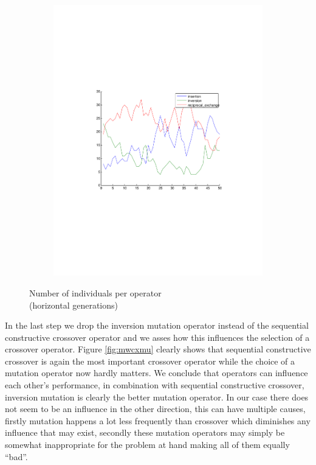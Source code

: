 \documentclass[a4paper]{article}
\begin{document}
\begin{figure}[h]
\begin{subfigure}[h]{0.49\textwidth}
    \includegraphics[width=\textwidth,trim={4cm 8cm 4cm 8cm},clip]{cwmu}
    \end{subfigure}
    \captionsetup{justification=centering}
    \caption{Number of individuals per operator\\
    		(horizontal generations)}
    \label{fig:cwcxmu}
\end{figure}

In the last step we drop the inversion mutation operator instead of
the sequential constructive crossover operator and we asses how this
influences the selection of a crossover operator.
Figure \ref{fig:mwcxmu} clearly shows that sequential constructive
crossover is again the most important crossover operator while the
choice of a mutation operator now hardly matters.
We conclude that operators can influence each other's performance,
in combination with sequential constructive crossover, inversion
mutation is clearly the better mutation operator.
In our case there does not seem to be an influence in the other
direction, this can have multiple causes, firstly mutation happens
a lot less frequently than crossover which diminishes any influence
that may exist, secondly these mutation operators may simply be
somewhat inappropriate for the problem at hand making all of them
equally ``bad''.
\end{document}

